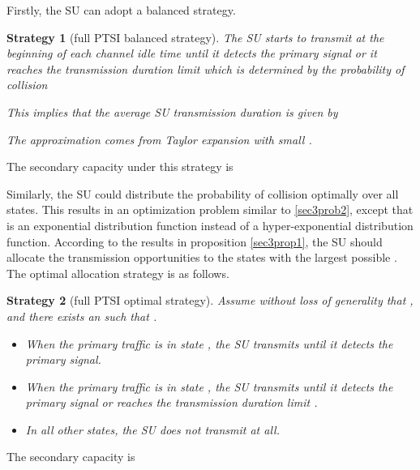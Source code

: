 \documentclass[10pt,final,journal,letterpaper]{IEEEtran}
\newtheorem{strategy}{Strategy}
\begin{document}
\par
Firstly, the SU can adopt a balanced strategy.
\begin{strategy}[full PTSI balanced strategy]
The SU starts to transmit at the beginning of each channel idle time until it detects the primary signal or it reaches the transmission duration limit  which is determined by the probability of collision

This implies that the average SU transmission duration is given by

The approximation comes from Taylor expansion with small .
\end{strategy}
The secondary capacity under this strategy is


\par
Similarly, the SU could distribute the probability of collision optimally over all states. This results in an optimization problem similar to \eqref{sec3prob2}, except that  is an exponential distribution function instead of a hyper-exponential distribution function. According to the results in proposition \ref{sec3prop1}, the SU should allocate the transmission opportunities to the states with the largest possible . The optimal allocation strategy is as follows.
\begin{strategy}[full PTSI optimal strategy]
Assume without loss of generality that , and there exists an  such that .
\begin{itemize}
  \item When the primary traffic is in state , the SU transmits until it detects the primary signal.
  \item When the primary traffic is in state , the SU transmits until it detects the primary signal or reaches the transmission duration limit .
  \item In all other states, the SU does not transmit at all.
\end{itemize}
\end{strategy}
The secondary capacity is
\end{document}
